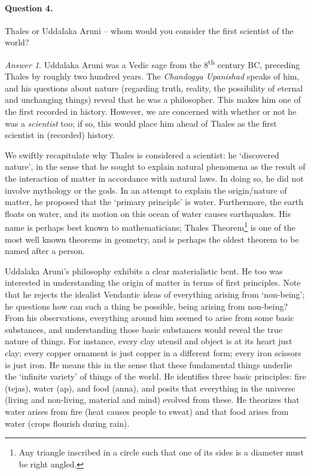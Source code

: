 \documentclass[11pt]{article}
\theoremstyle{remark}
\newtheorem*{answer}{Answer}
\begin{document}
    \paragraph{Question 4.} Thales or Uddalaka Aruni -- whom would you consider the
    first scientist of the world?
    \begin{answer}
        Uddalaka Aruni was a Vedic sage from the 8\textsuperscript{th} century BC,
        preceding Thales by roughly two hundred years. The \emph{Chandogya Upanishad}
        speaks of him, and his questions about nature (regarding truth, reality, the
        possibility of eternal and unchanging things) reveal that he was a
        philosopher. This makes him one of the first recorded in history. However, we
        are concerned with whether or not he was a \emph{scientist} too; if so, this
        would place him ahead of Thales as the first scientist in (recorded) history.

        We swiftly recapitulate why Thales is considered a scientist: he `discovered
        nature', in the sense that he sought to explain natural phenomena as the
        result of the interaction of matter in accordance with natural laws. In doing
        so, he did not involve mythology or the gods. In an attempt to explain the
        origin/nature of matter, he proposed that the `primary principle' is water.
        Furthermore, the earth floats on water, and its motion on this ocean of water
        causes earthquakes. His name is perhaps best known to mathematicians; Thales
        Theorem\footnote{Any triangle inscribed in a circle such that one of its
        sides is a diameter must be right angled.} is one of the most well known
        theorems in geometry, and is perhaps the oldest theorem to be named after a
        person.

        Uddalaka Aruni's philosophy exhibits a clear materialistic bent. He too was
        interested in understanding the origin of matter in terms of first
        principles. Note that he rejects the idealist Vendantic ideas of everything
        arising from `non-being'; he questions how can such a thing be possible,
        being arising from non-being? From his observations, everything around him
        seemed to arise from some basic substances, and understanding those basic
        substances would reveal the true nature of things. For instance, every clay
        utensil and object is at its heart just clay; every copper ornament is just
        copper in a different form; every iron scissors is just iron. He means this
        in the sense that these fundamental things underlie the `infinite variety' of
        things of the world. He identifies three basic principles: fire (tejas),
        water (ap), and food (anna), and posits that everything in the universe
        (living and non-living, material and mind) evolved from these. He theorizes
        that water arises from fire (heat causes people to sweat) and that food
        arises from water (crops flourish during rain).


\end{answer}
\end{document}
